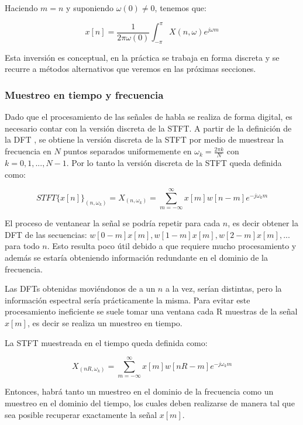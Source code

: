 Haciendo $m=n$ y suponiendo $\omega(0) \neq 0$, tenemos que:

\begin{equation*}
	x[n] = \frac{1}{2 \pi \omega(0)} \int_{- \pi}^{\pi} X(n, \omega) e^{j \omega m}
\end{equation*}

Esta inversión es conceptual, en la práctica se trabaja en forma discreta y se recurre a métodos alternativos que veremos en las próximas secciones.

\subsubsection{Muestreo en tiempo y frecuencia}
\label{sec:muestreo_en_tiempo_y_frecuencia}

Dado que el procesamiento de las señales de habla se realiza de forma digital, es necesario contar con la versión discreta de la STFT. A partir de la definición de la DFT \cite{oppenheim_schafer}, se obtiene la versión discreta de la STFT por medio de muestrear la frecuencia en $N$ puntos separados uniformemente en $\omega_k = \frac{2 \pi k}{N}$ con $k = 0, 1, ..., N-1$. Por lo tanto la versión discreta de la STFT queda definida como:

\begin{equation*}
	STFT\{x[n]\}_{(n, \omega_k)} = X_{(n, \omega_k)} = \sum_{m=-\infty}^{\infty} x[m]w[n-m]e^{-j \omega_k m}
\end{equation*}

El proceso de ventanear la señal se podría repetir para cada $n$, es decir obtener la DFT de las secuencias: $w[0-m] x[m], w[1-m] x[m], w[2-m] x[m], ...$ para todo $n$. Esto resulta poco útil debido a que requiere mucho procesamiento y además se estaría obteniendo información redundante en el dominio de la frecuencia. 

Las DFTs obtenidas moviéndonos de a un $n$ a la vez, serían distintas, pero la información espectral sería prácticamente la misma. Para evitar este procesamiento ineficiente se suele tomar una ventana cada R muestras de la señal $x[m]$, es decir se realiza un muestreo en tiempo. 

La STFT muestreada en el tiempo queda definida como:

\begin{equation*}
	X_{(nR, \omega_k)} = \sum_{m=-\infty}^{\infty} x[m]w[nR-m]e^{-j \omega_k m}
\end{equation*}

Entonces, habrá tanto un muestreo en el dominio de la frecuencia como un muestreo en el dominio del tiempo, los cuales deben realizarse de manera tal que sea posible recuperar exactamente la señal $x[m]$.

